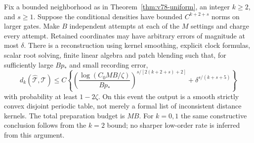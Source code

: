 \begin{theorem}
\label{thm:v78-records}
Fix a bounded neighborhood as in Theorem~\ref{thm:v78-uniform}, an
integer $k\ge2$, and $s\ge1$.  Suppose the conditional densities
have bounded $C^{k+2+s}$ norms on larger gates.  Make $B$ independent
attempts at each of the $M$ settings and charge every attempt.  Retained
coordinates may have arbitrary errors of magnitude at most $\delta$.
There is a reconstruction using kernel smoothing, explicit clock
formulas, scalar root solving, finite linear algebra and patch blending
such that, for sufficiently large $Bp_*$ and small recording error,
\begin{equation}\label{eq:v78-record-rate}
 d_k(\widehat{\mathcal T},\mathcal T)
 \le C\left\{
 \left(\frac{\log(C_0MB/\zeta)}{Bp_*}\right)^{s/[2(k+2+s)+2]}
       +\delta^{s/(k+s+5)}\right\}
\end{equation}
with probability at least $1-2\zeta$.  On this event the output is a
smooth strictly convex disjoint periodic table, not merely a formal
list of inconsistent distance kernels.  The total preparation budget
is $MB$.  For $k=0,1$ the same constructive conclusion follows from
the $k=2$ bound; no sharper low-order rate is inferred from this argument.
\end{theorem}

